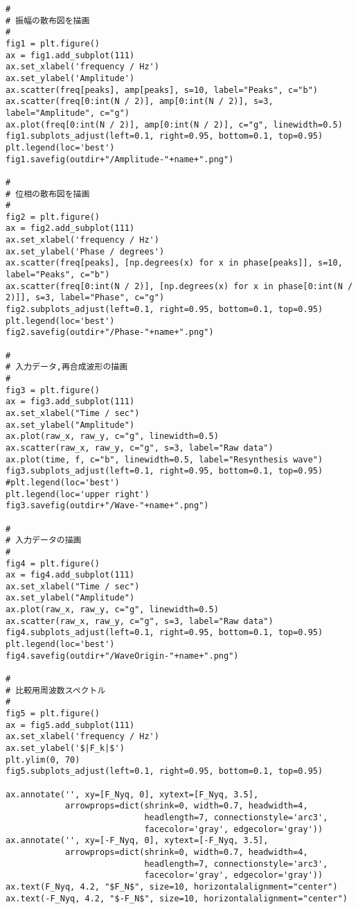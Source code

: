 \begin{lstlisting}[caption=FFT用pythonスクリプト,label=script]
#
# 振幅の散布図を描画
#
fig1 = plt.figure()
ax = fig1.add_subplot(111)
ax.set_xlabel('frequency / Hz')
ax.set_ylabel('Amplitude')
ax.scatter(freq[peaks], amp[peaks], s=10, label="Peaks", c="b")
ax.scatter(freq[0:int(N / 2)], amp[0:int(N / 2)], s=3, label="Amplitude", c="g")
ax.plot(freq[0:int(N / 2)], amp[0:int(N / 2)], c="g", linewidth=0.5)
fig1.subplots_adjust(left=0.1, right=0.95, bottom=0.1, top=0.95)
plt.legend(loc='best')
fig1.savefig(outdir+"/Amplitude-"+name+".png")

#
# 位相の散布図を描画
#
fig2 = plt.figure()
ax = fig2.add_subplot(111)
ax.set_xlabel('frequency / Hz')
ax.set_ylabel('Phase / degrees')
ax.scatter(freq[peaks], [np.degrees(x) for x in phase[peaks]], s=10, label="Peaks", c="b")
ax.scatter(freq[0:int(N / 2)], [np.degrees(x) for x in phase[0:int(N / 2)]], s=3, label="Phase", c="g")
fig2.subplots_adjust(left=0.1, right=0.95, bottom=0.1, top=0.95)
plt.legend(loc='best')
fig2.savefig(outdir+"/Phase-"+name+".png")

#
# 入力データ,再合成波形の描画
#
fig3 = plt.figure()
ax = fig3.add_subplot(111)
ax.set_xlabel("Time / sec")
ax.set_ylabel("Amplitude")
ax.plot(raw_x, raw_y, c="g", linewidth=0.5)
ax.scatter(raw_x, raw_y, c="g", s=3, label="Raw data")
ax.plot(time, f, c="b", linewidth=0.5, label="Resynthesis wave")
fig3.subplots_adjust(left=0.1, right=0.95, bottom=0.1, top=0.95)
#plt.legend(loc='best')
plt.legend(loc='upper right')
fig3.savefig(outdir+"/Wave-"+name+".png")

#
# 入力データの描画
#
fig4 = plt.figure()
ax = fig4.add_subplot(111)
ax.set_xlabel("Time / sec")
ax.set_ylabel("Amplitude")
ax.plot(raw_x, raw_y, c="g", linewidth=0.5)
ax.scatter(raw_x, raw_y, c="g", s=3, label="Raw data")
fig4.subplots_adjust(left=0.1, right=0.95, bottom=0.1, top=0.95)
plt.legend(loc='best')
fig4.savefig(outdir+"/WaveOrigin-"+name+".png")

#
# 比較用周波数スペクトル
#
fig5 = plt.figure()
ax = fig5.add_subplot(111)
ax.set_xlabel('frequency / Hz')
ax.set_ylabel('$|F_k|$')
plt.ylim(0, 70)
fig5.subplots_adjust(left=0.1, right=0.95, bottom=0.1, top=0.95)

ax.annotate('', xy=[F_Nyq, 0], xytext=[F_Nyq, 3.5],
            arrowprops=dict(shrink=0, width=0.7, headwidth=4,
                            headlength=7, connectionstyle='arc3',
                            facecolor='gray', edgecolor='gray'))
ax.annotate('', xy=[-F_Nyq, 0], xytext=[-F_Nyq, 3.5],
            arrowprops=dict(shrink=0, width=0.7, headwidth=4,
                            headlength=7, connectionstyle='arc3',
                            facecolor='gray', edgecolor='gray'))
ax.text(F_Nyq, 4.2, "$F_N$", size=10, horizontalalignment="center")
ax.text(-F_Nyq, 4.2, "$-F_N$", size=10, horizontalalignment="center")


\end{lstlisting}
